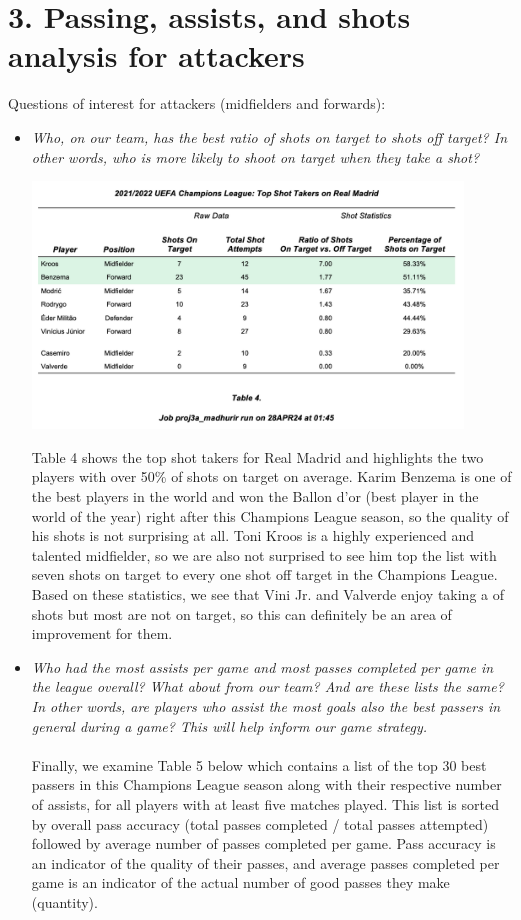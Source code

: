 \documentclass[11pt]{report}
\begin{document}
\section*{3. Passing, assists, and shots analysis for attackers}
Questions of interest for attackers (midfielders and forwards):
	\begin{itemize}
		\item \textit{Who, on our team, has the best ratio of shots on target to shots off target? In other words, who is more likely to shoot on target when they take a shot?}
			\begin{center}
				\includegraphics[width=0.9\textwidth]{images_for_report/table4}
			\end{center} 
			Table 4 shows the top shot takers for Real Madrid and highlights the two players with over 50\% of shots on target on average. Karim Benzema is one of the best players in the world and won the Ballon d'or (best player in the world of the year) right after this Champions League season, so the quality of his shots is not surprising at all. Toni Kroos is a highly experienced and talented midfielder, so we are also not surprised to see him top the list with seven shots on target to every one shot off target in the Champions League. Based on these statistics, we see that Vini Jr. and Valverde enjoy taking a of shots but most are not on target, so this can definitely be an area of improvement for them.
		\item \textit{Who had the most assists per game and most passes completed per game in the league overall? What about from our team? And are these lists the same? In other words, are players who assist the most goals also the best passers in general during a game? This will help inform our game strategy.} \\ \\
			Finally, we examine Table 5 below which contains a list of the top 30 best passers in this Champions League season along with their respective number of assists, for all players with at least five matches played. This list is sorted by overall pass accuracy (total passes completed / total passes attempted) followed by average number of passes completed per game. Pass accuracy is an indicator of the quality of their passes, and average passes completed per game is an indicator of the actual number of good passes they make (quantity). \\\\

\end{itemize}
\end{document}
